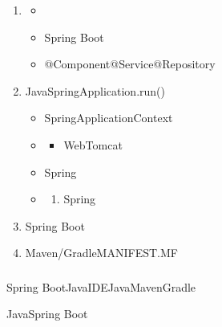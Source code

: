 \begin{enumerate}
\def\labelenumi{\arabic{enumi}.}
\item

  \begin{itemize}
  \item
  \item
    Spring Boot
  \item
    @Component@Service@Repository
  \end{itemize}
\item
  JavaSpringApplication.run()

  \begin{itemize}
  \item
    SpringApplicationContext
  \item
    \begin{itemize}
    \tightlist
    \item
      WebTomcat
    \end{itemize}
  \item
    Spring
  \item
    \begin{enumerate}
    \def\labelenumii{\arabic{enumii}.}
        \tightlist
    \item
      Spring
    \end{enumerate}
  \end{itemize}
\item
  Spring Boot
\item
  \important{}Maven/GradleMANIFEST.MF
\end{enumerate}

\hypertarget{section-24}{%
\subsubsection{}\label{section-24}}

Spring
BootJavaIDEJavaMavenGradle

JavaSpring Boot\important{}

